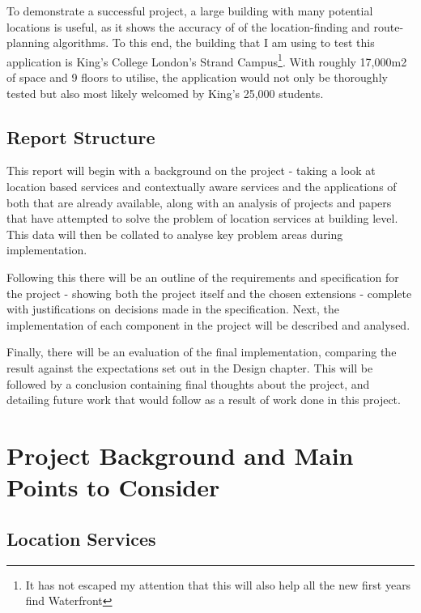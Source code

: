 \documentclass[11pt]{informatics-report}
\begin{document}
To demonstrate a successful project, a large building with many potential locations is useful, as it shows the accuracy of of the location-finding and route-planning algorithms. To this end, the building that I am using to test this application is King's College London's Strand Campus\footnote{It has not escaped my attention that this will also help all the new first years find Waterfront}. With roughly 17,000m2 of space and 9 floors to utilise, the application would not only be thoroughly tested but also most likely welcomed by King's 25,000 students\cite{headcount}.

\section{Report Structure}

This report will begin with a background on the project - taking a look at location based services and contextually aware services and the applications of both that are already available, along with an analysis of projects and papers that have attempted to solve the problem of location services at building level. This data will then be collated to analyse key problem areas during implementation. 

Following this there will be an outline of the requirements and specification for the project - showing both the project itself and the chosen extensions - complete with justifications on decisions made in the specification. Next, the implementation of each component in the project will be described and analysed. 

Finally, there will be an evaluation of the final implementation, comparing the result against the expectations set out in the Design chapter. This will be followed by a conclusion containing final thoughts about the project, and detailing future work that would follow as a result of work done in this project. 


\chapter{Project Background and Main Points to Consider}

\section{Location Services}
\end{document}
